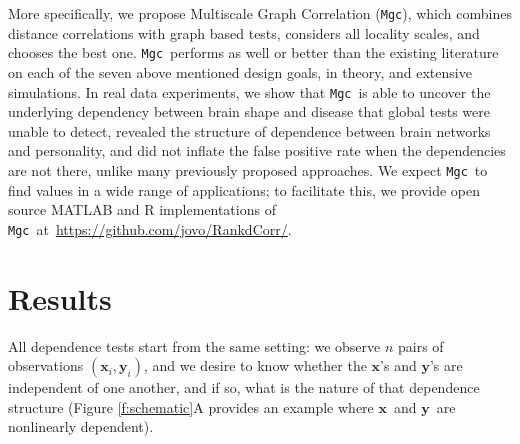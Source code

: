 \documentclass[11pt]{article}
\providecommand{\sct}[1]{{\sc \texttt{#1}}}
\providecommand{\mb}[1]{\boldsymbol{#1}}
\newcommand{\Mgc}{\sct{Mgc}}
\newcommand{\website}{\url{https://github.com/jovo/RankdCorr/}}
\newcommand{\mbx}{\ensuremath{\mb{x}}}
\newcommand{\mby}{\ensuremath{\mb{y}}}
\begin{document}
More specifically,  we propose Multiscale Graph Correlation (\Mgc), 
which combines distance correlations with graph based tests, considers all locality scales, and chooses the best one.
\Mgc~performs as well or better than the existing literature on each of the seven above mentioned design goals, in theory, and extensive simulations. 
In real data experiments, we show that \Mgc~is able to uncover the underlying dependency between brain shape and disease that global tests were unable to detect, revealed the structure of dependence between brain networks and personality, and did not inflate the false positive rate when the dependencies are not there, unlike many previously proposed approaches.  
We  expect \Mgc~to find values in a wide range of applications; to facilitate this, we provide open source MATLAB and R implementations of \Mgc~at~\website.

\section{Results}
\label{s:results}

All dependence tests start from the same setting: we observe $n$ pairs of observations $(\mbx_i,\mby_i)$, and we desire to know whether the \mbx's and \mby's are independent of one another, and if so, what is the nature of that dependence structure (Figure \ref{f:schematic}A provides an example where \mbx~and \mby~are nonlinearly dependent).  
\end{document}
